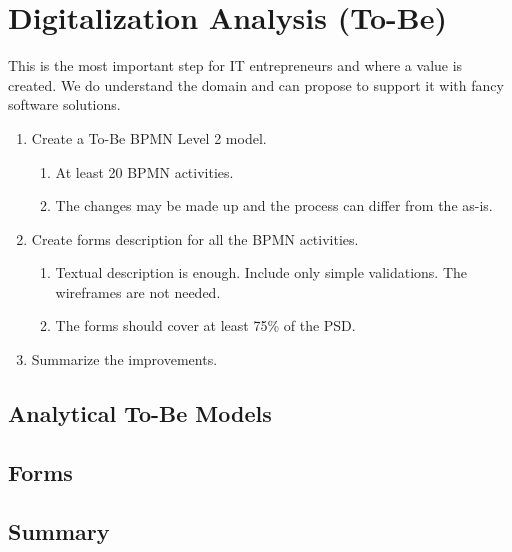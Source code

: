 \chapter{Digitalization Analysis (To-Be)}
This is the most important step for IT entrepreneurs and where a value is created. We do understand the domain and can propose to support it with fancy software solutions. 

\begin{enumerate}
    \item Create a To-Be BPMN Level 2 model. 
        \begin{enumerate}
            \item At least 20 BPMN activities. 
            \item The changes may be made up and the process can differ from the as-is. 
        \end{enumerate}
    \item Create forms description for all the BPMN activities. 
     \begin{enumerate}
            \item Textual description is enough. Include only simple validations. The wireframes are not needed. 
            \item The forms should cover at least 75\% of the PSD. 
        \end{enumerate}
    \item Summarize the improvements. 
\end{enumerate}

\section{Analytical To-Be Models}

\section{Forms}

\section{Summary}
